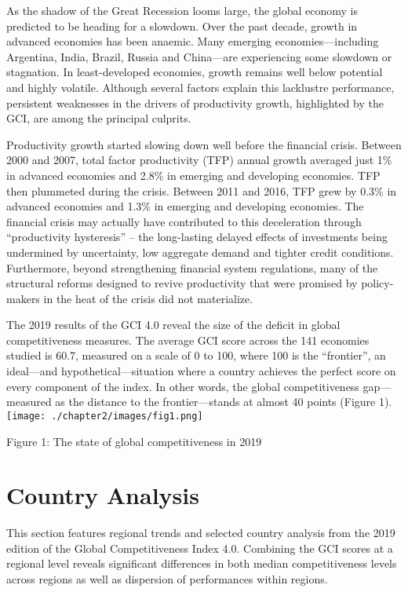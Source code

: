 \documentclass[
]{article}
\begin{document}
As the shadow of the Great Recession looms large, the global economy is
predicted to be heading for a slowdown. Over the past decade, growth in
advanced economies has been anaemic. Many emerging economies---including
Argentina, India, Brazil, Russia and China---are experiencing some
slowdown or stagnation. In least-developed economies, growth remains
well below potential and highly volatile. Although several factors
explain this lacklustre performance, persistent weaknesses in the
drivers of productivity growth, highlighted by the GCI, are among the
principal culprits.

Productivity growth started slowing down well before the financial
crisis. Between 2000 and 2007, total factor productivity (TFP) annual
growth averaged just 1\% in advanced economies and 2.8\% in emerging and
developing economies. TFP then plummeted during the crisis. Between 2011
and 2016, TFP grew by 0.3\% in advanced economies and 1.3\% in emerging
and developing economies. The financial crisis may actually have
contributed to this deceleration through ``productivity hysteresis'' --
the long-lasting delayed effects of investments being undermined by
uncertainty, low aggregate demand and tighter credit conditions.
Furthermore, beyond strengthening financial system regulations, many of
the structural reforms designed to revive productivity that were
promised by policy-makers in the heat of the crisis did not materialize.

The 2019 results of the GCI 4.0 reveal the size of the deficit in global
competitiveness measures. The average GCI score across the 141 economies
studied is 60.7, measured on a scale of 0 to 100, where 100 is the
``frontier'', an ideal---and hypothetical---situation where a country
achieves the perfect score on every component of the index. In other
words, the global competitiveness gap---measured as the distance to the
frontier---stands at almost 40 points (Figure
1).\texttt{[image: ./chapter2/images/fig1.png]}

Figure 1: The state of global competitiveness in 2019

\hypertarget{country-analysis}{%
\section{Country Analysis}\label{country-analysis}}

This section features regional trends and selected country analysis from
the 2019 edition of the Global Competitiveness Index 4.0. Combining the
GCI scores at a regional level reveals significant differences in both
median competitiveness levels across regions as well as dispersion of
performances within regions.
\end{document}
